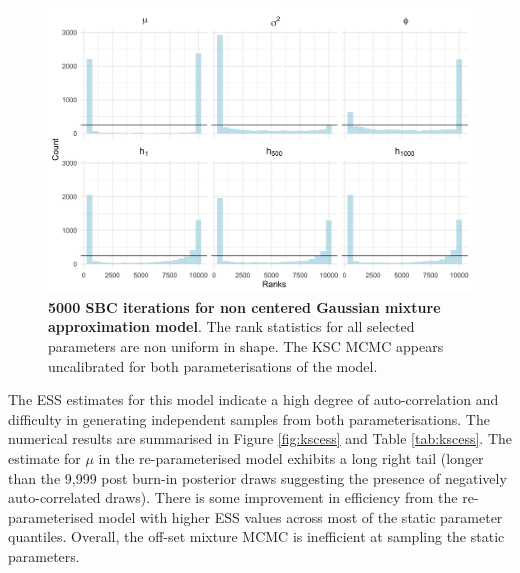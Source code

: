 \documentclass[12pt, a4paper]{article}
\begin{document}
    \begin{figure}[H]
        \centering
        \includegraphics[scale=0.09]{results/ksc_ncp_5k.png}
        \caption{\textbf{5000 SBC iterations for non centered Gaussian mixture approximation model}. The rank statistics for all selected parameters are non uniform in shape. The KSC MCMC appears uncalibrated for both parameterisations of the model.}
        \label{fig:ncpksc5k}
    \end{figure}

    The ESS estimates for this model indicate a high degree of auto-correlation and difficulty in generating independent samples from both parameterisations. The numerical results are summarised in Figure \ref{fig:kscess} and Table \ref{tab:kscess}. The estimate for $\mu$ in the re-parameterised model exhibits a long right tail (longer than the 9,999 post burn-in posterior draws suggesting the presence of negatively auto-correlated draws). There is some improvement in efficiency from the re-parameterised model with higher ESS values across most of the static parameter quantiles. Overall, the off-set mixture MCMC is inefficient at sampling the static parameters. 
    

\end{document}
